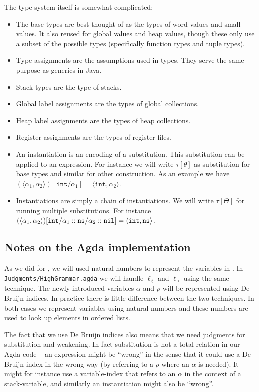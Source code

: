 The type system itself is somewhat complicated:

\begin{itemize}
\item The base types are best thought of as the types of word values and small
  values. It also reused for global values and heap values, though these only
  use a subset of the possible types (specifically function types and tuple types).
\item Type assignments are the assumptions used in types. They serve the same
  purpose as generics in Java.
\item Stack types are the type of stacks.
\item Global label assignments are the types of global collections.
\item Heap label assignments are the types of heap collections.
\item Register assignments are the types of register files.
\item An instantiation is an encoding of a substitution. This substitution can
  be applied to an expression. For instance we will write $\tau[\theta]$ as
  substitution for base types and similar for other construction. As an example
  we have
  $(\langle \alpha_1, \alpha_2 \rangle)[\mathtt{int} / \alpha_1] = \langle
  \mathtt{int}, \alpha_2 \rangle$.
\item Instantiations are simply a chain of instantiations. We will write
  $\tau[\Theta]$ for running multiple substitutions.  For instance
  $(\langle \alpha_1, \alpha_2 \rangle)[\mathtt{int} / \alpha_1 :: \mathtt{ns} /
  \alpha_2 :: \mathtt{nil}] = \langle \mathtt{int}, \mathtt{ns} \rangle$.
\end{itemize}

\subsection{Notes on the Agda implementation}

As we did for \ATALe, we will used natural numbers to represent the variables in
\ATAL. In \texttt{Judgments/HighGrammar.agda} we will handle $\ell_{\mathrm{g}}$
and $\ell_{\mathrm{h}}$ using the same technique. The newly introduced variables
$\alpha$ and $\rho$ will be represented using De Bruijn indices. In practice
there is little difference between the two techniques. In both cases we
represent variables using natural numbers and these numbers are used to look up
elements in ordered lists.

The fact that we use De Bruijn indices also means that we need judgments for
substitution and weakening. In fact substitution is not a total relation in our
Agda code -- an expression might be ``wrong'' in the sense that it could use a
De Bruijn index in the wrong way (by referring to a $\rho$ where an $\alpha$ is
needed). It might for instance use a variable-index that refers to an $\alpha$
in the context of a stack-variable, and similarly an instantiation might also be
``wrong''.


